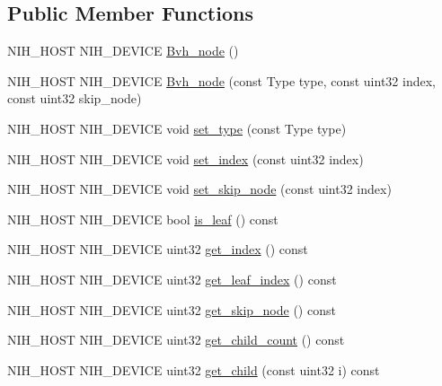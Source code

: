 \subsection*{\-Public \-Member \-Functions}
\begin{DoxyCompactItemize}
\item 
\-N\-I\-H\-\_\-\-H\-O\-S\-T \-N\-I\-H\-\_\-\-D\-E\-V\-I\-C\-E \hyperlink{structnih_1_1_bvh__node_a9c5cc985a82d40aa2261f54f4dd6cb48}{\-Bvh\-\_\-node} ()
\item 
\-N\-I\-H\-\_\-\-H\-O\-S\-T \-N\-I\-H\-\_\-\-D\-E\-V\-I\-C\-E \hyperlink{structnih_1_1_bvh__node_a9e47e12cb0b74d5dab425d52728655dc}{\-Bvh\-\_\-node} (const \-Type type, const uint32 index, const uint32 skip\-\_\-node)
\item 
\-N\-I\-H\-\_\-\-H\-O\-S\-T \-N\-I\-H\-\_\-\-D\-E\-V\-I\-C\-E void \hyperlink{structnih_1_1_bvh__node_ab09c9d3422fee1af8c59f71af6ecf64a}{set\-\_\-type} (const \-Type type)
\item 
\-N\-I\-H\-\_\-\-H\-O\-S\-T \-N\-I\-H\-\_\-\-D\-E\-V\-I\-C\-E void \hyperlink{structnih_1_1_bvh__node_a06c1cb6707abd1528279589bece1219b}{set\-\_\-index} (const uint32 index)
\item 
\-N\-I\-H\-\_\-\-H\-O\-S\-T \-N\-I\-H\-\_\-\-D\-E\-V\-I\-C\-E void \hyperlink{structnih_1_1_bvh__node_a43b2efd756d9247f3346514acb6b42ef}{set\-\_\-skip\-\_\-node} (const uint32 index)
\item 
\-N\-I\-H\-\_\-\-H\-O\-S\-T \-N\-I\-H\-\_\-\-D\-E\-V\-I\-C\-E bool \hyperlink{structnih_1_1_bvh__node_aa05acdb24d7dcaa05c312f2c438b3222}{is\-\_\-leaf} () const 
\item 
\-N\-I\-H\-\_\-\-H\-O\-S\-T \-N\-I\-H\-\_\-\-D\-E\-V\-I\-C\-E uint32 \hyperlink{structnih_1_1_bvh__node_a47f6279f9f1573509bd8432cbba838ba}{get\-\_\-index} () const 
\item 
\-N\-I\-H\-\_\-\-H\-O\-S\-T \-N\-I\-H\-\_\-\-D\-E\-V\-I\-C\-E uint32 \hyperlink{structnih_1_1_bvh__node_abece4a67339eb87d77bcde89eddc99fd}{get\-\_\-leaf\-\_\-index} () const 
\item 
\-N\-I\-H\-\_\-\-H\-O\-S\-T \-N\-I\-H\-\_\-\-D\-E\-V\-I\-C\-E uint32 \hyperlink{structnih_1_1_bvh__node_ad38cb99e5f6fd655af6e8564d33ec13b}{get\-\_\-skip\-\_\-node} () const 
\item 
\-N\-I\-H\-\_\-\-H\-O\-S\-T \-N\-I\-H\-\_\-\-D\-E\-V\-I\-C\-E uint32 \hyperlink{structnih_1_1_bvh__node_a90bab612db7374f45473be06a157af25}{get\-\_\-child\-\_\-count} () const 
\item 
\-N\-I\-H\-\_\-\-H\-O\-S\-T \-N\-I\-H\-\_\-\-D\-E\-V\-I\-C\-E uint32 \hyperlink{structnih_1_1_bvh__node_aaafd54ee653c9dd8a30df95050db0d1f}{get\-\_\-child} (const uint32 i) const 
\end{DoxyCompactItemize}
